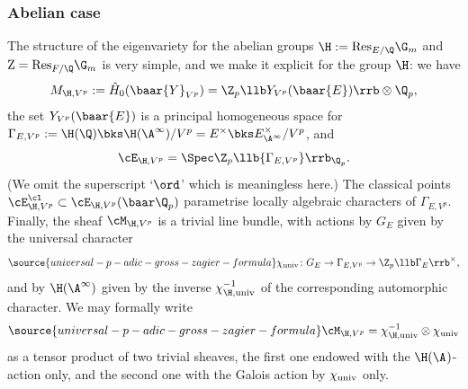 \subsubsection{Abelian case}
The structure  of the eigenvariety for the abelian groups $\H:={\rm Res}_{E/\Q}\G_{m}$ and ${\rm Z}={\rm Res}_{F/\Q}\G_{m}$
 is very simple, and we make it explicit  for the group $\H$: we have
$$M_{\H, V^{p}}:= \hat H_{0}(\baar{Y}_{V^{p}})=  \Z_{p}\llb Y_{V^{p}}( \baar{E})\rrb\otimes\Q_{p},$$
the set $ Y_{V^{p}}(\baar{E})$ is a principal homogeneous space for $\Gamma_{E,V^{p}}:=\H(\Q)\bks \H(\A^{\infty})/V^{p}= E^{\times}\bks E_{\A^{\infty}}^{\times}/V^{p}$, and
$$\cE_{\H, V^{p}}= \Spec \Z_{p}\llb{\Gamma_{E, V^{p}}}\rrb_{\Q_{p}}.$$
(We omit the superscript `$\ord$' which is meaningless here.)
The  classical points
 $\cE_{\H, V^{p}}^{\cl}\subset \cE_{\H, V^{p}}(\baar\Q_{p})$ parametrise locally algebraic characters of $\Gamma_{E, V^{p}}$.
Finally, the sheaf $\cM_{\H, V^{p}}$ is a trivial line bundle, with actions  by $G_{E}$ given by the universal character
\begin{align}\label{chiuniv}
\source{universal-p-adic-gross-zagier-formula}
\chi_{\rm univ}\colon G_{E}\to \Gamma_{E, V^{p}}\to\Z_{p}\llb\Gamma_{E}\rrb^{\times},
\end{align} and by  $\H(\A^{\infty})$  given by the inverse  $\chi_{\H, \rm univ}^{-1}$ of the  corresponding automorphic character. We may formally write
\begin{align}\label{chiHuniv}
\source{universal-p-adic-gross-zagier-formula}
\cM_{\H, V^{p}}= \chi_{\H, \rm univ}^{-1}\otimes \chi_{\rm univ}
\end{align}
as a tensor product of two trivial sheaves, the first one endowed with the $\H(\A^{})$-action only, and the second one with the Galois action by $ \chi_{\rm univ}$ only.%

